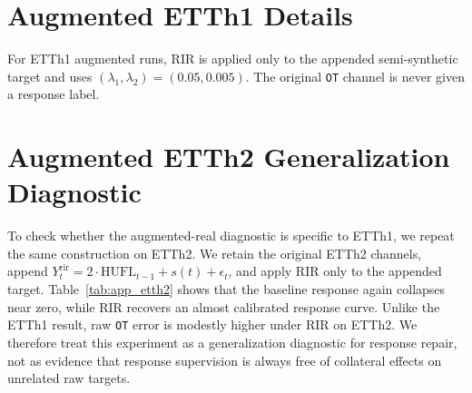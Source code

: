 \documentclass{article}
\begin{document}
\section{Augmented ETTh1 Details}
\label{app:etth}

For ETTh1 augmented runs, RIR is applied only to the appended semi-synthetic target
and uses $(\lambda_1,\lambda_2)=(0.05,0.005)$. The original \texttt{OT} channel is
never given a response label.

\begin{table}[htbp]
\centering
\caption{Full ETTh1 augmented side-effect diagnostic. Prediction length 96 uses
three seeds; prediction length 192 is a one-seed probe.}
\label{tab:app_etth}
\end{table}

\section{Augmented ETTh2 Generalization Diagnostic}
\label{app:etth2}

To check whether the augmented-real diagnostic is specific to ETTh1, we repeat the
same construction on ETTh2. We retain the original ETTh2 channels, append
$Y^{\mathrm{rir}}_t=2\cdot\mathrm{HUFL}_{t-1}+s(t)+\epsilon_t$, and apply RIR only
to the appended target. Table~\ref{tab:app_etth2} shows that the baseline response
again collapses near zero, while RIR recovers an almost calibrated response curve.
Unlike the ETTh1 result, raw \texttt{OT} error is modestly higher under RIR on
ETTh2. We therefore treat this experiment as a generalization diagnostic for
response repair, not as evidence that response supervision is always free of
collateral effects on unrelated raw targets.
\end{document}
